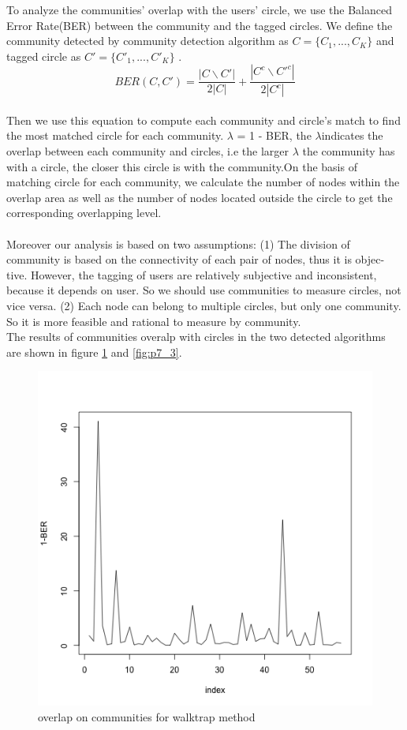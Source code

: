 \documentclass{article}
\begin{document}
\noindent To analyze the communities' overlap with the users' circle, we use the Balanced Error Rate(BER) between the community and the tagged circles. We define the community detected by community detection algorithm as $C=\{C_1,...,C_K \}$ and tagged circle as $C'=\{C'_1,...,C'_K\}$ .
\begin{equation*}
BER(C,C') = \frac{|C\backslash C'|}{2|C|} + \frac{|C^c\backslash C'^c|}{2|C^c|}
\end{equation*}
\\
Then we use this equation to compute each community and circle's match to find the most matched circle for each community. $\lambda$ = 1 - BER,  the $\lambda$indicates the overlap between each community and circles, i.e the larger $\lambda$ the community has with a circle, the closer this circle is with the community.On the basis of matching circle for each community, we calculate the number of nodes within the overlap area as well as the number of nodes located outside the circle to get the corresponding overlapping level.\\
\\
Moreover our analysis is based on two assumptions:
(1) The division of community is based on the connectivity of each pair of nodes, thus it is objec- tive. However, the tagging of users are relatively subjective and inconsistent, because it depends on user. So we should use communities to measure circles, not vice versa.
(2) Each node can belong to multiple circles, but only one community. So it is more feasible and rational to measure by community.
\\
The results of communities overalp with circles in the two detected algorithms are shown in figure
\ref{fig:p7_2} and \ref{fig:p7_3}.

\begin{figure}[htbp]
\centering
\includegraphics[width=.8\textwidth]{7_5.png}
\caption{overlap on communities for walktrap method}
\label{fig:p7_2}
\end{figure}
\end{document}
